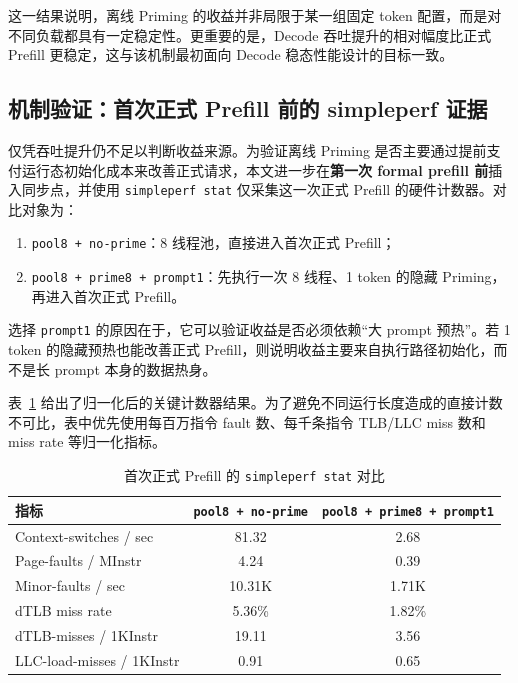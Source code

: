 这一结果说明，离线 Priming 的收益并非局限于某一组固定 token 配置，而是对不同负载都具有一定稳定性。更重要的是，Decode 吞吐提升的相对幅度比正式 Prefill 更稳定，这与该机制最初面向 Decode 稳态性能设计的目标一致。

\subsection{机制验证：首次正式 Prefill 前的 simpleperf 证据}

仅凭吞吐提升仍不足以判断收益来源。为验证离线 Priming 是否主要通过提前支付运行态初始化成本来改善正式请求，本文进一步在\textbf{第一次 formal prefill 前}插入同步点，并使用 \texttt{simpleperf stat} 仅采集这一次正式 Prefill 的硬件计数器。对比对象为：

\begin{enumerate}
  \item \texttt{pool8 + no-prime}：8 线程池，直接进入首次正式 Prefill；
  \item \texttt{pool8 + prime8 + prompt1}：先执行一次 8 线程、1 token 的隐藏 Priming，再进入首次正式 Prefill。
\end{enumerate}

选择 \texttt{prompt1} 的原因在于，它可以验证收益是否必须依赖“大 prompt 预热”。若 1 token 的隐藏预热也能改善正式 Prefill，则说明收益主要来自执行路径初始化，而不是长 prompt 本身的数据热身。

表~\ref{tab:decode-prime-simpleperf} 给出了归一化后的关键计数器结果。为了避免不同运行长度造成的直接计数不可比，表中优先使用每百万指令 fault 数、每千条指令 TLB/LLC miss 数和 miss rate 等归一化指标。

\begin{table}[ht]
  \centering
  \caption{首次正式 Prefill 的 \texttt{simpleperf stat} 对比}
  \label{tab:decode-prime-simpleperf}
  \begin{tabular}{l c c}
    \hline
    指标 & \texttt{pool8 + no-prime} & \texttt{pool8 + prime8 + prompt1} \\
    \hline
    Context-switches / sec & 81.32 & 2.68 \\
    Page-faults / MInstr & 4.24 & 0.39 \\
    Minor-faults / sec & 10.31K & 1.71K \\
    dTLB miss rate & 5.36\% & 1.82\% \\
    dTLB-misses / 1KInstr & 19.11 & 3.56 \\
    LLC-load-misses / 1KInstr & 0.91 & 0.65 \\
    \hline
  \end{tabular}
\end{table}

